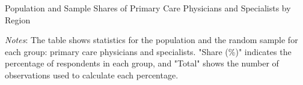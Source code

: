 \documentclass[11pt]{article}
\theoremstyle{definition}
\begin{document}
\begin{table}[H]
    \centering
    \caption{Population and Sample Shares of Primary Care Physicians and Specialists by Region}
              \begin{adjustbox}{width=0.65\linewidth}  

\end{adjustbox}
     \parbox{.9\linewidth}{
        	\vspace{.2cm}
        		\scriptsize{\scriptsize{{\emph{Notes}: The table shows statistics for the population and the random sample for each group: primary care physicians and specialists. "Share (\%)" indicates the percentage of respondents in each group, and "Total" shows the number of observations used to calculate each percentage.}}}}
    \label{tab:sanity_geo}
\end{table}



%
\end{document}
